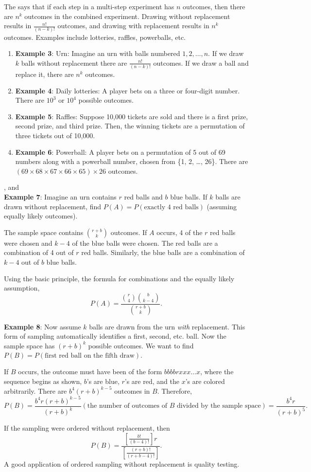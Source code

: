 The  says that if each step in a multi-step experiment has $n$ outcomes, then there are $n^k$ outcomes in the combined experiment. Drawing without replacement results in $\frac{n!}{(n-k)!}$ outcomes, and drawing with replacement results in $n^k$ outcomes. Examples include lotteries, raffles, powerballs, etc.
\begin{enumerate}
    \item \textbf{Example 3}: Urn: Imagine an urn with balls numbered $1, 2, \ldots, n$. If we draw $k$ balls without replacement there are $\frac{n!}{(n-k)!}$ outcomes. If we draw a ball and replace it, there are $n^k$ outcomes.
    \item \textbf{Example 4}: Daily lotteries: A player bets on a three or four-digit number. There are $10^3$ or $10^4$ possible outcomes.
    \item \textbf{Example 5}: Raffles: Suppose 10,000 tickets are sold and there is a first prize, second prize, and third prize. Then, the winning tickets are a permutation of three tickets out of 10,000.
    \item \textbf{Example 6}: Powerball: A player bets on a permutation of 5 out of 69 numbers along with a powerball number, chosen from \{1, 2, \ldots, 26\}. There are $(69 \times 68 \times 67 \times 66 \times 65) \times 26$ outcomes.
\end{enumerate}

, and \\

\textbf{Example 7}: Imagine an urn contains $r$ red balls and $b$ blue balls. If $k$ balls are drawn without replacement, find $P(A) = P(\text{exactly 4 red balls})$ (assuming equally likely outcomes). 

The sample space contains $r+b \choose k$ outcomes. If $A$ occurs, 4 of the $r$ red balls were chosen and $k-4$ of the blue balls were chosen. The red balls are a combination of 4 out of $r$ red balls. Similarly, the blue balls are a combination of $k-4$ out of $b$ blue balls.

Using the basic principle, the formula for combinations and the equally likely assumption, $$P(A) = \frac{{r \choose 4}{b \choose k-4}}{{r+b \choose k}}.$$

\textbf{Example 8}: Now assume $k$ balls are drawn from the urn \textit{with} replacement. This form of sampling automatically identifies a first, second, etc. ball. Now the sample space has $(r+b)^k$ possible outcomes. We want to find $P(B) = P(\text{first red ball on the fifth draw})$.

If $B$ occurs, the outcome must have been of the form $bbbbrxxx \ldots x$, where the sequence begins as shown, $b$'s are blue, $r$'s are red, and the $x$'s are colored arbitrarily. There are $b^4(r+b)^{k-5}$ outcomes in $B$. Therefore, $$P(B) = \frac{b^4r(r+b)^{k-5}}{(r+b)^k} (\text{the number of outcomes of $B$ divided by the sample space}) = \frac{b^4r}{(r+b)^5}.$$

If the sampling were ordered without replacement, then $$P(B)=\frac{[\frac{b!}{(b-4)!}]r}{[\frac{(r+b)!}{(r+b-4)!}]}.$$ A good application of ordered sampling without replacement is quality testing.